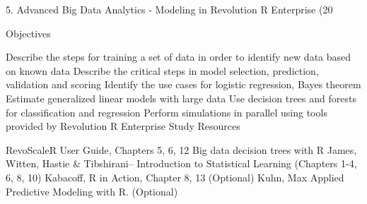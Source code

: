 5. Advanced Big Data Analytics - Modeling in Revolution R Enterprise (20%

Objectives

Describe the steps for training a set of data in order to identify new data based on known data
Describe the critical steps in model selection, prediction, validation and scoring
Identify the use cases for logistic regression, Bayes theorem
Estimate generalized linear models with large data
Use decision trees and forests for classification and regression
Perform simulations in parallel using tools provided by Revolution R Enterprise
Study Resources

RevoScaleR User Guide, Chapters 5, 6, 12
Big data decision trees with R
James, Witten, Hastie & Tibshirani– Introduction to Statistical Learning (Chapters 1-4, 6, 8, 10)
Kabacoff, R in Action, Chapter 8, 13 (Optional)
Kuhn, Max Applied Predictive Modeling with R. (Optional)
